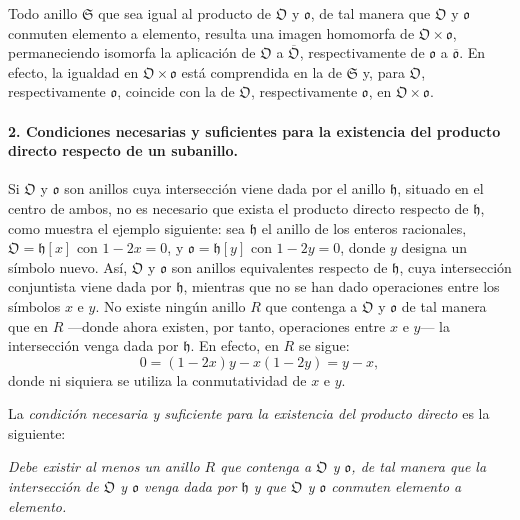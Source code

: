 Todo anillo $\mathfrak S$ que sea igual al producto de $\mathfrak O$ y $\mathfrak o$, de tal manera que $\mathfrak O$ y $\mathfrak o$ conmuten elemento a elemento, resulta una imagen homomorfa de $\mathfrak O\times\mathfrak o$, permaneciendo isomorfa la aplicación de $\mathfrak O$ a $\overline{\mathfrak O}$, respectivamente de $\mathfrak o$ a $\overline{\mathfrak o}$. En efecto, la igualdad en $\mathfrak O\times\mathfrak o$ está comprendida en la de $\mathfrak S$ y, para $\mathfrak O$, respectivamente $\mathfrak o$, coincide con la de $\mathfrak O$, respectivamente $\mathfrak o$, en $\mathfrak O\times\mathfrak o$.

\paragraph{2. Condiciones necesarias y suficientes para la existencia del producto directo respecto de un subanillo.}
Si $\mathfrak O$ y $\mathfrak o$ son anillos cuya intersección viene dada por el anillo $\mathfrak h$, situado en el centro de ambos, no es necesario que exista el producto directo respecto de $\mathfrak h$, como muestra el ejemplo siguiente: sea $\mathfrak h$ el anillo de los enteros racionales, $\mathfrak O=\mathfrak h[x]$ con $1-2x=0$, y $\mathfrak o=\mathfrak h[y]$ con $1-2y=0$, donde $y$ designa un símbolo nuevo. Así, $\mathfrak O$ y $\mathfrak o$ son anillos equivalentes respecto de $\mathfrak h$, cuya intersección conjuntista viene dada por $\mathfrak h$, mientras que no se han dado operaciones entre los símbolos $x$ e $y$. No existe ningún anillo $R$ que contenga a $\mathfrak O$ y $\mathfrak o$ de tal manera que en $R$ ---donde ahora existen, por tanto, operaciones entre $x$ e $y$--- la intersección venga dada por $\mathfrak h$. En efecto, en $R$ se sigue:
\[
0=(1-2x)y-x(1-2y)=y-x,
\]
donde ni siquiera se utiliza la conmutatividad de $x$ e $y$.

La \emph{condición necesaria y suficiente para la existencia del producto directo} es la siguiente:

\emph{Debe existir al menos un anillo $R$ que contenga a $\mathfrak O$ y $\mathfrak o$, de tal manera que la intersección de $\mathfrak O$ y $\mathfrak o$ venga dada por $\mathfrak h$ y que $\mathfrak O$ y $\mathfrak o$ conmuten elemento a elemento.}


